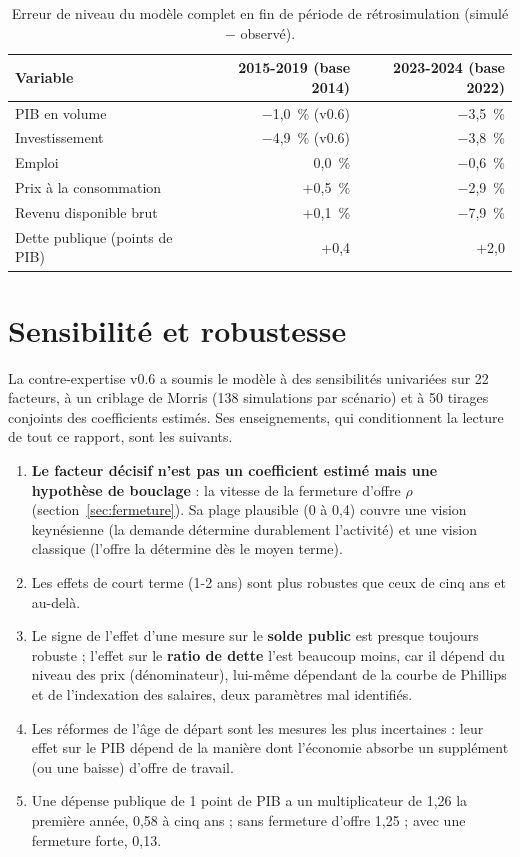 \begin{table}[htbp]
\centering\small
\caption{Erreur de niveau du modèle complet en fin de période de rétrosimulation (simulé $-$ observé).}
\label{tab:retro}
\begin{tabular}{@{}lrr@{}}
\toprule
Variable & 2015-2019 (base 2014) & 2023-2024 (base 2022) \\
\midrule
PIB en volume & $-$1,0~\% (v0.6) & $-$3,5~\% \\
Investissement & $-$4,9~\% (v0.6) & $-$3,8~\% \\
Emploi & 0,0~\% & $-$0,6~\% \\
Prix à la consommation & +0,5~\% & $-$2,9~\% \\
Revenu disponible brut & +0,1~\% & $-$7,9~\% \\
Dette publique (points de PIB) & +0,4 & +2,0 \\
\bottomrule
\end{tabular}
\end{table}

\section{Sensibilité et robustesse}

La contre-expertise v0.6 a soumis le modèle à des sensibilités univariées sur 22 facteurs, à un criblage de Morris
(138 simulations par scénario) et à 50 tirages conjoints des coefficients estimés. Ses enseignements, qui conditionnent
la lecture de tout ce rapport, sont les suivants.
\begin{enumerate}
\item \textbf{Le facteur décisif n'est pas un coefficient estimé mais une hypothèse de bouclage} : la vitesse de la
fermeture d'offre $\rho$ (section~\ref{sec:fermeture}). Sa plage plausible (0 à 0,4) couvre une vision keynésienne
(la demande détermine durablement l'activité) et une vision classique (l'offre la détermine dès le moyen terme).
\item Les effets de court terme (1-2 ans) sont plus robustes que ceux de cinq ans et au-delà.
\item Le signe de l'effet d'une mesure sur le \textbf{solde public} est presque toujours robuste ; l'effet sur le
\textbf{ratio de dette} l'est beaucoup moins, car il dépend du niveau des prix (dénominateur), lui-même dépendant de la
courbe de Phillips et de l'indexation des salaires, deux paramètres mal identifiés.
\item Les réformes de l'âge de départ sont les mesures les plus incertaines : leur effet sur le PIB dépend de la manière
dont l'économie absorbe un supplément (ou une baisse) d'offre de travail.
\item Une dépense publique de 1 point de PIB a un multiplicateur de 1,26 la première année, 0,58 à cinq ans ; sans
fermeture d'offre 1,25 ; avec une fermeture forte, 0,13.
\end{enumerate}

